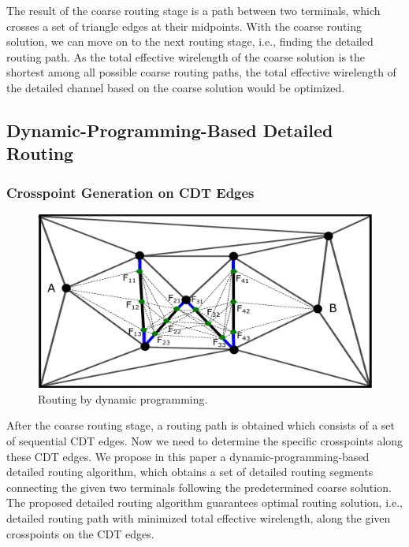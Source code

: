 \documentclass[journal]{IEEEtran}
\begin{document}
The result of the coarse routing stage is a path between two terminals,
 which crosses a set of triangle edges at their midpoints. 
 With the coarse routing solution, we can move on to the next routing stage, i.e., finding the detailed routing path. 
As the total effective wirelength of the coarse solution is the shortest among all possible coarse routing paths, the total effective wirelength of the detailed channel based on the coarse solution would be optimized.

\subsection{Dynamic-Programming-Based Detailed Routing}
\label{sec:dp}

\subsubsection{Crosspoint Generation on CDT Edges}

\begin{figure}[htbp]
\centering
\includegraphics[width=0.9\columnwidth, angle=0]{./Figs/DP.pdf}
\vspace{-0.15cm}
\caption{Routing by dynamic programming.}
\label{fig:dp}
\end{figure}

After the coarse routing stage, a routing path is obtained which consists of a set of sequential CDT edges. 
Now we need to determine the specific crosspoints along these CDT edges. 
We propose in this paper a dynamic-programming-based detailed routing algorithm, which obtains a set of detailed routing segments connecting the given two terminals following the predetermined coarse solution. 
The proposed detailed routing algorithm guarantees optimal routing solution,
i.e., detailed routing path with minimized total effective wirelength,
along the given crosspoints on the CDT edges. 
\end{document}
